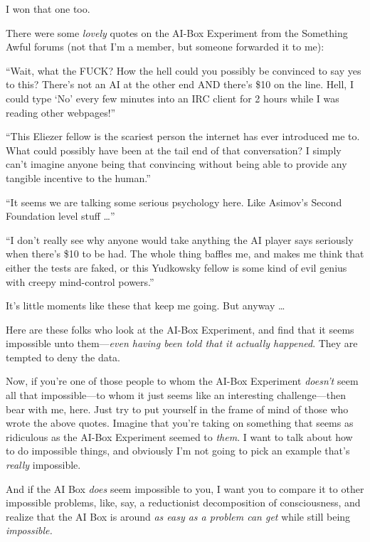 {
 I won that one too.}

{
 There were some \textit{lovely} quotes on the AI-Box Experiment
from the Something Awful forums (not that I'm a member,
but someone forwarded it to me):}

{
 ``Wait, what the FUCK? How the hell could you
possibly be convinced to say yes to this? There's not
an AI at the other end AND there's \$10 on the line.
Hell, I could type `No' every few
minutes into an IRC client for 2 hours while I was reading other
webpages!''}

{
 ``This Eliezer fellow is the scariest person the
internet has ever introduced me to. What could possibly have been at
the tail end of that conversation? I simply can't
imagine anyone being that convincing without being able to provide any
tangible incentive to the human.''}

{
 ``It seems we are talking some serious psychology
here. Like Asimov's Second Foundation level stuff
\ldots''}

{
 ``I don't really see why anyone
would take anything the AI player says seriously when
there's \$10 to be had. The whole thing baffles me, and
makes me think that either the tests are faked, or this Yudkowsky
fellow is some kind of evil genius with creepy mind-control
powers.''}

{
 It's little moments like these that keep me going.
But anyway \ldots}

{
 Here are these folks who look at the AI-Box Experiment, and find
that it seems impossible unto them---\textit{even having been told that
it actually happened}. They are tempted to deny the data.}

{
 Now, if you're one of those people to whom the
AI-Box Experiment \textit{doesn't} seem all that
impossible---to whom it just seems like an interesting challenge---then
bear with me, here. Just try to put yourself in the frame of mind of
those who wrote the above quotes. Imagine that you're
taking on something that seems as ridiculous as the AI-Box Experiment
seemed to \textit{them}. I want to talk about how to do impossible
things, and obviously I'm not going to pick an example
that's \textit{really} impossible.}

{
 And if the AI Box \textit{does} seem impossible to you, I want you
to compare it to other impossible problems, like, say, a reductionist
decomposition of consciousness, and realize that the AI Box is around
\textit{as easy as a problem can get} while still being
\textit{impossible.}}


